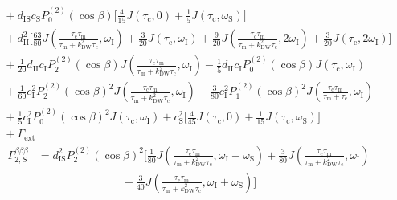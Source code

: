 \begin{appendixtext}
\begin{equation*}
\begin{split}
&\hspace{4pt}+d_{\text{IS}}c_{\text{S}}P_0^{(2)}(\cos\beta)\bigg[\frac{4}{15}J\left(\tau_{\text{c}},0\right)+\frac{1}{5}J\left(\tau_{\text{c}},\omega_{\text{S}}\right)\bigg] \\
&\hspace{4pt}+d_{\text{II}}^2\bigg[\frac{63}{80}J\left(\frac{\tau_{\text{c}}\tau_{\text{m}}}{\tau_{\text{m}}+k_{\text{DW}}^2\tau_{\text{c}}},\omega_{\text{I}}\right)+\frac{3}{20}J\left(\tau_{\text{c}},\omega_{\text{I}}\right)+\frac{9}{20}J\left(\frac{\tau_{\text{c}}\tau_{\text{m}}}{\tau_{\text{m}}+k_{\text{DW}}^2\tau_{\text{c}}},2\omega_{\text{I}}\right)+\frac{3}{20}J\left(\tau_{\text{c}},2\omega_{\text{I}}\right)\bigg] \\
&\hspace{4pt}+ \frac{1}{20} d_{\text{II}}c_{\text{I}}P_2^{(2)}(\cos\beta) J\left(\frac{\tau_{\text{c}}\tau_{\text{m}}}{\tau_{\text{m}}+k_{\text{DW}}^2\tau_{\text{c}}},\omega_{\text{I}}\right)- \frac{1}{5} d_{\text{II}}c_{\text{I}}P_0^{(2)}(\cos\beta) J\left(\tau_{\text{c}},\omega_{\text{I}}\right) \\ 
&\hspace{4pt}+\frac{1}{60} c_{\text{I}}^2P_2^{(2)}(\cos\beta)^2 J\left(\frac{\tau_{\text{c}}\tau_{\text{m}}}{\tau_{\text{m}}+k_{\text{DW}}^2\tau_{\text{c}}},\omega_{\text{I}}\right)+\frac{3}{80} c_{\text{I}}^2P_1^{(2)}(\cos\beta)^2 J\left(\frac{\tau_{\text{c}}\tau_{\text{m}}}{\tau_{\text{m}}+\tau_{\text{c}}},\omega_{\text{I}}\right) \\
&\hspace{4pt}+\frac{1}{5} c_{\text{I}}^2P_0^{(2)}(\cos\beta)^2J\left(\tau_{\text{c}},\omega_{\text{I}}\right)+c_{\text{S}}^2\bigg[\frac{4}{45}J\left(\tau_{\text{c}},0\right)+\frac{1}{15}J(\tau_{\text{c}},\omega_{\text{S}})\bigg]\\
&\hspace{4pt} +\Gamma_{\text{ext}}
\end{split}
\end{equation*}
\begin{equation*}
\begin{split}
\Gamma_{2,S}^{\beta\beta\beta}&=d_{\text{IS}}^2P_2^{(2)}(\cos\beta)^2\bigg[\frac{1}{80}J\left(\frac{\tau_{\text{c}}\tau_{\text{m}}}{\tau_{\text{m}}+k_{\text{DW}}^2\tau_{\text{c}}},\omega_{\text{I}}-\omega_{\text{S}}\right)+\frac{3}{80}J\left(\frac{\tau_{\text{c}}\tau_{\text{m}}}{\tau_{\text{m}}+k_{\text{DW}}^2\tau_{\text{c}}},\omega_{\text{I}}\right) \\ 
&\hspace{90pt}+\frac{3}{40}J\left(\frac{\tau_{\text{c}}\tau_{\text{m}}}{\tau_{\text{m}}+k_{\text{DW}}^2\tau_{\text{c}}},\omega_{\text{I}}+\omega_{\text{S}}\right)\bigg] \\

\end{split}
\end{equation*}
\end{appendixtext}
